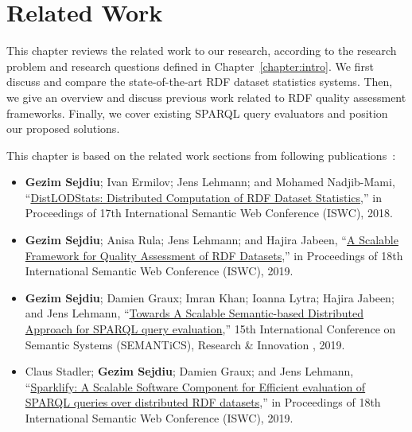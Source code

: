 \chapter{Related Work}
\label{chapter:related}

This chapter reviews the related work to our research, according to the research problem and research questions defined in Chapter~\ref{chapter:intro}.
We first discuss and compare the state-of-the-art \gls{RDF} dataset statistics systems.
Then, we give an overview and discuss previous work related to \gls{RDF} quality assessment frameworks. 
Finally, we cover existing \gls{SPARQL} query evaluators and position our proposed solutions. 

This chapter is based on the related work sections from following publications~\cite{sejdiu-2018-dist-lod-stats-iswc,sejdiu-2019-sansa-dist-quality-assessment-iswc,sejdiu-2019-sansa-semantic-based-semantics, 2019-sansa-sparklify-iswc}:

\begin{itemize}
    \item \textbf{Gezim Sejdiu}; Ivan Ermilov; Jens Lehmann; and Mohamed Nadjib-Mami, “\href{http://jens-lehmann.org/files/2018/iswc_distlodstats.pdf}{DistLODStats: Distributed Computation of RDF Dataset Statistics},” in Proceedings of 17th International Semantic Web Conference (ISWC), 2018.

    \item \textbf{Gezim Sejdiu}; Anisa Rula; Jens Lehmann; and Hajira Jabeen, “\href{http://jens-lehmann.org/files/2019/iswc_dist_quality_assessment.pdf}{A Scalable Framework for Quality Assessment of RDF Datasets},” in Proceedings of 18th International Semantic Web Conference (ISWC), 2019.

    \item \textbf{Gezim Sejdiu}; Damien Graux; Imran Khan; Ioanna Lytra; Hajira Jabeen; and Jens Lehmann, “\href{https://gezimsejdiu.github.io/publications/semantic_based_query_paper_SEMANTICS2019.pdf}{Towards A Scalable Semantic-based Distributed Approach for SPARQL query evaluation},” 15th International Conference on Semantic Systems (SEMANTiCS), Research \& Innovation , 2019.

    \item Claus Stadler; \textbf{Gezim Sejdiu}; Damien Graux; and Jens Lehmann, “\href{http://jens-lehmann.org/files/2019/iswc_sparklify.pdf}{Sparklify: A Scalable Software Component for Efficient evaluation of SPARQL queries over distributed RDF datasets},” in Proceedings of 18th International Semantic Web Conference (ISWC), 2019.
    
\end{itemize}

